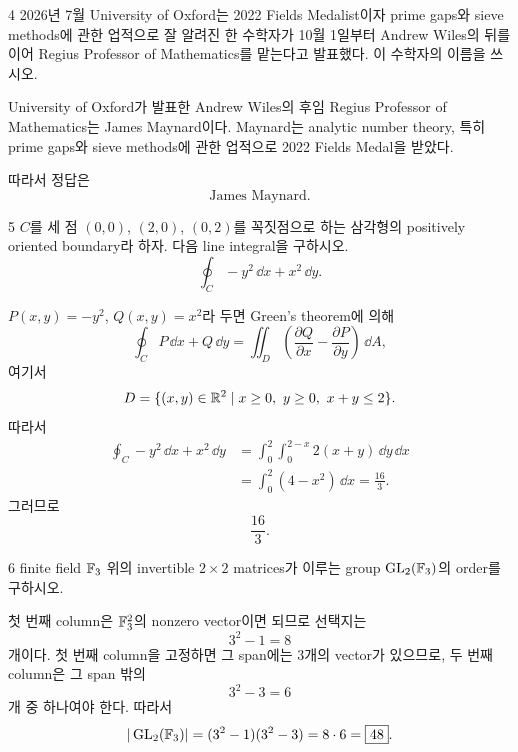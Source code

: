 \begin{problem}{4}
2026년 7월 University of Oxford는 2022 Fields Medalist이자 prime gaps와 sieve methods에 관한 업적으로 잘 알려진 한 수학자가 10월 1일부터 Andrew Wiles의 뒤를 이어 Regius Professor of Mathematics를 맡는다고 발표했다. 이 수학자의 이름을 쓰시오.
\end{problem}

\begin{solution}
University of Oxford가 발표한 Andrew Wiles의 후임 Regius Professor of Mathematics는 James Maynard이다. Maynard는 analytic number theory, 특히 prime gaps와 sieve methods에 관한 업적으로 2022 Fields Medal을 받았다.

따라서 정답은
\[
    \boxed{\text{James Maynard}}.
\]
\end{solution}

\begin{problem}{5}
$C$를 세 점 $(0,0)$, $(2,0)$, $(0,2)$를 꼭짓점으로 하는 삼각형의 positively oriented boundary라 하자. 다음 line integral을 구하시오.
\[
    \oint_C -y^2\,\dd x+x^2\,\dd y.
\]
\end{problem}

\begin{solution}
$P(x,y)=-y^2$, $Q(x,y)=x^2$라 두면 Green's theorem에 의해
\[
    \oint_C P\,\dd x+Q\,\dd y
    =
    \iint_D
    \left(
        \frac{\partial Q}{\partial x}
        -
        \frac{\partial P}{\partial y}
    \right)\,\dd A,
\]
여기서
\[
    D=\{(x,y)\in\R^2\mid x\geq0,\ y\geq0,\ x+y\leq2\}.
\]
따라서
\[
    \begin{aligned}
    \oint_C -y^2\,\dd x+x^2\,\dd y
    &=
    \int_0^2\int_0^{2-x}2(x+y)\,\dd y\,\dd x\\
    &=
    \int_0^2(4-x^2)\,\dd x
    =\frac{16}{3}.
    \end{aligned}
\]
그러므로
\[
    \boxed{\frac{16}{3}}.
\]
\end{solution}

\begin{problem}{6}
finite field $\mathbb{F}_3$ 위의 invertible $2\times2$ matrices가 이루는 group $\operatorname{GL}_2(\mathbb{F}_3)$의 order를 구하시오.
\end{problem}

\begin{solution}
첫 번째 column은 $\mathbb{F}_3^2$의 nonzero vector이면 되므로 선택지는
\[
    3^2-1=8
\]
개이다. 첫 번째 column을 고정하면 그 span에는 $3$개의 vector가 있으므로, 두 번째 column은 그 span 밖의
\[
    3^2-3=6
\]
개 중 하나여야 한다. 따라서
\[
    |\operatorname{GL}_2(\mathbb{F}_3)|
    =(3^2-1)(3^2-3)
    =8\cdot6
    =\boxed{48}.
\]
\end{solution}

